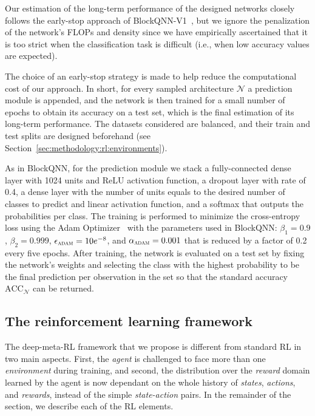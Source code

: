 Our estimation of the long-term performance of the designed networks closely follows the early-stop approach of BlockQNN-V1~\citep{BlockQNN}, but we ignore the penalization of the network's FLOPs and density since we have empirically ascertained that it is too strict when the classification task is difficult (i.e., when low accuracy values are expected).

The choice of an early-stop strategy is made to help reduce the computational cost of our approach. In short, for every sampled architecture $\mathcal{N}$ a prediction module is appended, and the network is then trained for a small number of epochs to obtain its accuracy on a test set, which is the final estimation of its long-term performance. The datasets considered are balanced, and their train and test splits are designed beforehand (see Section~\ref{sec:methodology:rl:environments}). %

As in BlockQNN, for the prediction module we stack a fully-connected dense layer with 1024 units and ReLU activation function, a dropout layer with rate of 0.4, a dense layer with the number of units equals to the desired number of classes to predict and linear activation function, and a softmax that outputs the probabilities per class. The training is performed to minimize the cross-entropy loss using the Adam Optimizer~\citep{Adam} with the parameters used in BlockQNN: $\beta_1=0.9$, $\beta_2=0.999$, $\epsilon_{\textsc{adam}}=10e^{-8}$, and $\alpha_\textsc{adam}=0.001$ that is reduced by a factor of 0.2 every five epochs. After training, the network is evaluated on a test set by fixing the network's weights and selecting the class with the highest probability to be the final prediction per observation in the set so that the standard accuracy $\text{ACC}_{\mathcal{N}}$ can be returned.

\subsection{The reinforcement learning framework}\label{sec:methodology:rl}

The deep-meta-RL framework that we propose is different from standard RL in two main aspects. First, the \textit{agent} is challenged to face more than one \textit{environment} during training, and second, the distribution over the \textit{reward} domain learned by the agent is now dependant on the whole history of \textit{states}, \textit{actions}, and \textit{rewards}, instead of the simple \textit{state-action} pairs. 
In the remainder of the section, we describe each of the RL elements.


